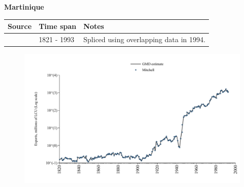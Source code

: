 \documentclass[12pt,a4paper,landscape]{article}
\begin{document}
\begin{adjustbox}{max totalsize={\paperwidth}{\paperheight},center}
\begin{minipage}[t][\textheight][t]{\textwidth}
\vspace*{0.5cm}
{}
\begin{center}
{\Large\bfseries Martinique}
\end{center}
\vspace{0.5cm}
\begin{table}[H]
\centering
\small
\begin{tabular}{|l|l|l|}
\hline
\textbf{Source} & \textbf{Time span} & \textbf{Notes} \\
\hline
\rowcolor{white}\cite{Mitchell}& 1821 - 1993 &Spliced using overlapping data in 1994.\\
\hline
\end{tabular}
\end{table}
\begin{figure}[H]
\centering
\includegraphics[width=\textwidth,height=0.6\textheight,keepaspectratio]{graphs/MTQ_exports.pdf}
\end{figure}
\end{minipage}
\end{adjustbox}
\end{document}
